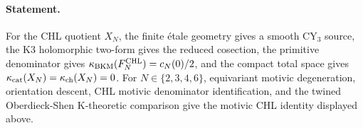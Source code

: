 \paragraph{Statement.}
For the CHL quotient \(X_N\), the finite \'etale geometry gives a smooth
CY$_3$ source, the K3 holomorphic two-form gives the reduced cosection,
the primitive denominator gives
\(\kappa_{\mathrm{BKM}}(F^{\mathrm{CHL}}_N)=c_N(0)/2\), and the compact total space gives
\(\kappa_{\mathrm{cat}}(X_N)=\kappa_{\mathrm{ch}}(X_N)=0\). For \(N\in\{2,3,4,6\}\), equivariant
motivic degeneration, orientation descent, CHL motivic denominator
identification, and the twined Oberdieck-Shen K-theoretic comparison
give the motivic CHL identity displayed above.
